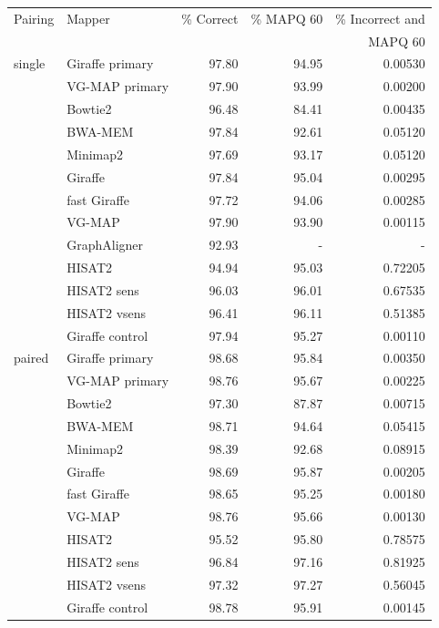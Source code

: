 \documentclass[11pt]{ucscthesis}
\begin{document}
\begin{table}[H]
    \centering
    \begin{tabular}{|l|l|r|r|r|}
    \hline
        Pairing & Mapper & \% Correct & \% MAPQ 60 & \% Incorrect and \\
               &         &            &            & MAPQ 60          \\
        \hline
        single  & Giraffe primary	& 97.80     & 94.95     & 0.00530 \\
                & VG-MAP primary	& 97.90     & 93.99     & 0.00200 \\
                & Bowtie2	        & 96.48     & 84.41     & 0.00435 \\
                & BWA-MEM       	& 97.84     & 92.61     & 0.05120 \\
                & Minimap2      	& 97.69     & 93.17     & 0.05120 \\
                & Giraffe       	& 97.84     & 95.04     & 0.00295 \\
                & fast Giraffe	    & 97.72     & 94.06     & 0.00285 \\
                & VG-MAP           	& 97.90     & 93.90     & 0.00115 \\
                & GraphAligner 	    & 92.93     & -         & - \\
                & HISAT2        	& 94.94     & 95.03     & 0.72205 \\
                & HISAT2 sens	    & 96.03     & 96.01     & 0.67535 \\
                & HISAT2 vsens  	& 96.41     & 96.11     & 0.51385 \\
                & Giraffe control	& 97.94     & 95.27     & 0.00110 \\

        \hline
        paired  & Giraffe primary	& 98.68     & 95.84     & 0.00350 \\
                & VG-MAP primary   	& 98.76     & 95.67     & 0.00225 \\
                & Bowtie2	        & 97.30     & 87.87     & 0.00715 \\
                & BWA-MEM       	& 98.71     & 94.64     & 0.05415 \\
                & Minimap2      	& 98.39     & 92.68     & 0.08915 \\
                & Giraffe	        & 98.69     & 95.87     & 0.00205 \\
                & fast Giraffe  	& 98.65     & 95.25     & 0.00180 \\
                & VG-MAP	        & 98.76     & 95.66     & 0.00130 \\
                & HISAT2        	& 95.52     & 95.80     & 0.78575 \\
                & HISAT2 sens	    & 96.84     & 97.16     & 0.81925 \\
                & HISAT2 vsens	    & 97.32     & 97.27     & 0.56045 \\
                & Giraffe control	& 98.78     & 95.91     & 0.00145 \\


\end{tabular}
\end{table}
\end{document}
